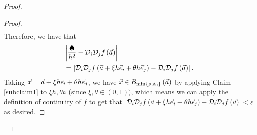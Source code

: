 \documentclass[main.tex]{subfiles}
\begin{document}
\begin{proof}
\begin{proof}
\begin{align*}
        \end{align*}
        Therefore, we have that
        \begin{align*}
            &\left\lvert \frac{\spadesuit}{h^2} - \mathcal{D}_i\mathcal{D}_jf\left( \vec{a} \right) \right\rvert \\
            &= \left\lvert \mathcal{D}_i\mathcal{D}_jf\left( \vec{a} + \xi h\vec{e}_i + \theta h \vec{e}_j \right) - \mathcal{D}_i\mathcal{D}_jf\left( \vec{a} \right) \right\rvert.
        \end{align*}
        Taking $\vec{x} = \vec{a} + \xi h\vec{e}_i + \theta h \vec{e}_j$, we have $\vec{x} \in B_{\min\left\{ \rho, \delta_0 \right\}}\left( \vec{a} \right)$ by applying Claim \ref{subclaim1} to $\xi h, \theta h$ (since $\xi, \theta\in (0, 1)$), which means we can apply the definition of continuity of $f$ to get that $\left\lvert \mathcal{D}_i\mathcal{D}_jf\left( \vec{a} + \xi h\vec{e}_i + \theta h \vec{e}_j \right) - \mathcal{D}_i\mathcal{D}_jf\left( \vec{a} \right) \right\rvert < \varepsilon$ as desired.
    \end{proof}
\end{proof}
\end{document}
